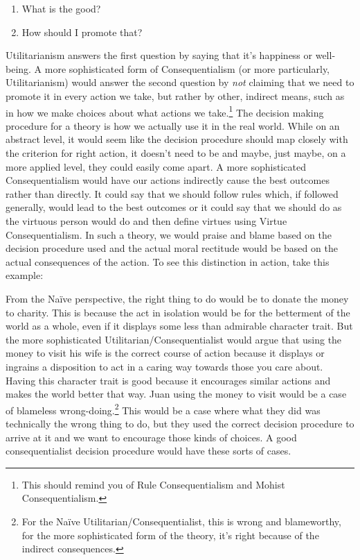 \begin{enumerate}
\item What is the good?
\item How should I promote that?
\end{enumerate}

Utilitarianism answers the first question by saying that it's happiness or well-being. A more sophisticated form of Consequentialism (or more particularly, Utilitarianism) would answer the second question by \emph{not} claiming that we need to promote it in every action we take, but rather by other, indirect means, such as in how we make choices about what actions we take.\footnote{This should remind you of Rule Consequentialism and Mohist Consequentialism.} The decision making procedure for a theory is how we actually use it in the real world. While on an abstract level, it would seem like the decision procedure should map closely with the criterion for right action, it doesn't need to be and maybe, just maybe, on a more applied level, they could easily come apart. A more sophisticated Consequentialism would have our actions indirectly cause the best outcomes rather than directly. It could say that we should follow rules which, if followed generally, would lead to the best outcomes or it could say that we should do as the virtuous person would do and then define virtues using Virtue Consequentialism. In such a theory, we would praise and blame based on the decision procedure used and the actual moral rectitude would be based on the actual consequences of the action. To see this distinction in action, take this example:

From the Naïve perspective, the right thing to do would be to donate the money to charity. This is because the act in isolation  would be for the betterment of the world as a whole, even if it displays some less than admirable character trait. But the more sophisticated Utilitarian/Consequentialist would argue that using the money to visit his wife is the correct course of action because it displays or ingrains a disposition to act in a caring way towards those you care about. Having this character trait is good because it encourages similar actions and makes the world better that way. Juan using the money to visit would be a case of blameless wrong-doing.\footnote{For the Na\"ive Utilitarian/Consequentialist, this is wrong and blameworthy, for the more sophisticated form of the theory, it's right because of the indirect consequences.} This would be a case where what they did was technically the wrong thing to do, but they used the correct decision procedure to arrive at it and we want to encourage those kinds of choices. A good consequentialist decision procedure would have these sorts of cases.

